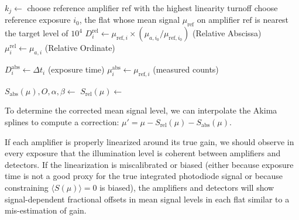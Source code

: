 \begin{algorithm}[H]
\caption{Double-spline linearity fit (single detector)}
\label{alg:linearity-double-spline}
\begin{algorithmic}[1]
    \State $k_j \leftarrow$ 
    \State {}
\EndFor
\State choose reference amplifier $\mathrm{ref}$ with the highest linearity turnoff
\State choose reference exposure $i_0$, the flat whose mean signal $\mu_{\mathrm{ref}}$ on amplifier $\mathrm{ref}$ is nearest the target level of $10^4$
        \State $D^{\mathrm{rel}}_{i} \leftarrow \mu_{\mathrm{ref}, i} \times (\mu_{a,i_0} / \mu_{\mathrm{ref}, i_0})$  (Relative Abscissa) %
        \State $\mu^{\mathrm{rel}}_{i} \leftarrow \mu_{a,i}$ (Relative Ordinate)
    \EndFor

    \State $D^{\mathrm{abs}}_{i} \leftarrow \Delta t_i$ (exposure time)
    \State $\mu^{\mathrm{abs}}_{i} \leftarrow \mu_{\mathrm{ref},i}$ (measured counts)
\EndFor

\Statex {}
\State $S_{\mathrm{abs}}(\mu), O, \alpha, \beta \leftarrow$ 
\State $S_{\mathrm{rel}}(\mu) \leftarrow$ 
\end{algorithmic}
\end{algorithm}

To determine the corrected mean signal level, we can interpolate the Akima splines to compute a correction: $\mu' = \mu - S_{\mathrm{rel}}(\mu) - S_{\mathrm{abs}}(\mu)$.

If each amplifier is properly linearized around its true gain, we should observe in every exposure that the illumination level is coherent between amplifiers and detectors.
If the linearization is miscalibrated or biased (either because exposure time is not a good proxy for the true integrated photodiode signal or because constraining $\langle S(\mu)\rangle = 0$ is biased), the amplifiers and detectors will show signal-dependent fractional offsets in mean signal levels in each flat similar to a mis-estimation of gain.

